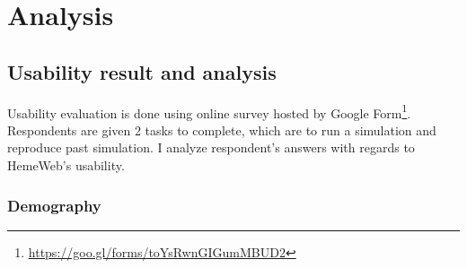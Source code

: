  

\chapter[Analysis]{Analysis}

\section{Usability result and analysis}

Usability evaluation is done using online survey hosted by Google Form\footnote{\url{https://goo.gl/forms/toYsRwnGIGumMBUD2}}. Respondents are given 2 tasks to complete, which are to run a simulation and reproduce past simulation. I analyze respondent's answers with regards to HemeWeb's usability.


\subsection{Demography}


\vspace{0.5cm}

\noindent%
\begin{minipage}{\linewidth}%
 \label{fig:survey-career}%
\end{minipage}

